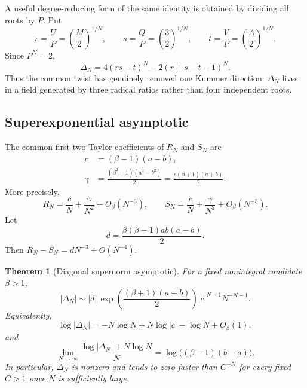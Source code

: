 \documentclass[11pt]{article}
\newtheorem{theorem}{Theorem}[section]
\theoremstyle{definition}
\theoremstyle{remark}
\newcommand{\abs}[1]{\left|#1\right|}
\begin{document}
A useful degree-reducing form of the same identity is obtained by dividing all
roots by $P$.  Put
\begin{equation}\label{eq:rst}
 r=\frac UP=\left(\frac M2\right)^{1/N},
 \qquad
 s=\frac QP=\left(\frac32\right)^{1/N},
 \qquad
 t=\frac VP=\left(\frac A2\right)^{1/N}.
\end{equation}
Since $P^N=2$,
\begin{equation}\label{eq:reducedDelta}
 \Delta_N=4(rs-t)^N-2(r+s-t-1)^N.
\end{equation}
Thus the common twist has genuinely removed one Kummer direction: $\Delta_N$
lives in a field generated by three radical ratios rather than four independent
roots.

\subsection{Superexponential asymptotic}

The common first two Taylor coefficients of $R_N$ and $S_N$ are
\begin{align}
 c&=(\beta-1)(a-b),\label{eq:cconst}\\
 \gamma&=\frac{(\beta^2-1)(a^2-b^2)}{2}
 =\frac{c(\beta+1)(a+b)}{2}.
 \label{eq:gammaconst}
\end{align}
More precisely,
\begin{equation}\label{eq:RSexpansion}
 R_N=\frac cN+\frac\gamma{N^2}+O_\beta(N^{-3}),
 \qquad
 S_N=\frac cN+\frac\gamma{N^2}+O_\beta(N^{-3}).
\end{equation}
Let
\begin{equation}\label{eq:dconst}
 d=\frac{\beta(\beta-1)ab(a-b)}2.
\end{equation}
Then $R_N-S_N=dN^{-3}+O(N^{-4})$.

\begin{theorem}[Diagonal supernorm asymptotic]\label{thm:supernorm}
For a fixed nonintegral candidate $\beta>1$,
\begin{equation}\label{eq:supernormasymp}
 \abs{\Delta_N}
 \sim
 \abs d\,
 \exp\!\left(\frac{(\beta+1)(a+b)}2\right)
 \abs c^{N-1}N^{-N-1}.
\end{equation}
Equivalently,
\begin{equation}\label{eq:supernormlog}
 \log\abs{\Delta_N}
 =-N\log N+N\log\abs c-\log N+O_\beta(1),
\end{equation}
and
\begin{equation}\label{eq:supernormlimit}
 \lim_{N\to\infty}
 \frac{\log\abs{\Delta_N}+N\log N}{N}
 =\log\bigl((\beta-1)(b-a)\bigr).
\end{equation}
In particular, $\Delta_N$ is nonzero and tends to zero faster than
$C^{-N}$ for every fixed $C>1$ once $N$ is sufficiently large.
\end{theorem}
\end{document}
